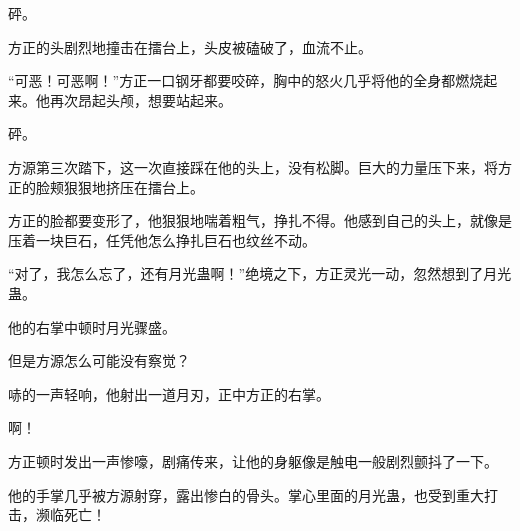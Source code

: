 \begin{this_body}
砰。

方正的头剧烈地撞击在擂台上，头皮被磕破了，血流不止。

“可恶！可恶啊！”方正一口钢牙都要咬碎，胸中的怒火几乎将他的全身都燃烧起来。他再次昂起头颅，想要站起来。

砰。

方源第三次踏下，这一次直接踩在他的头上，没有松脚。巨大的力量压下来，将方正的脸颊狠狠地挤压在擂台上。

方正的脸都要变形了，他狠狠地喘着粗气，挣扎不得。他感到自己的头上，就像是压着一块巨石，任凭他怎么挣扎巨石也纹丝不动。

“对了，我怎么忘了，还有月光蛊啊！”绝境之下，方正灵光一动，忽然想到了月光蛊。

他的右掌中顿时月光骤盛。

但是方源怎么可能没有察觉？

哧的一声轻响，他射出一道月刃，正中方正的右掌。

啊！

方正顿时发出一声惨嚎，剧痛传来，让他的身躯像是触电一般剧烈颤抖了一下。

他的手掌几乎被方源射穿，露出惨白的骨头。掌心里面的月光蛊，也受到重大打击，濒临死亡！

\end{this_body}

